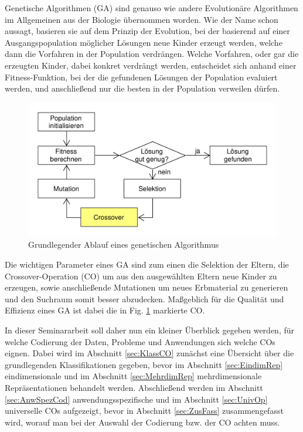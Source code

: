 \documentclass{llncs}
\begin{document}
	Genetische Algorithmen (GA) sind genauso wie andere Evolutionäre Algorithmen im Allgemeinen aus der Biologie übernommen worden. Wie der Name schon aussagt, basieren sie auf dem Prinzip der Evolution, bei der basierend auf einer Ausgangspopulation möglicher Lösungen neue Kinder erzeugt werden, welche dann die Vorfahren in der Population verdrängen. Welche Vorfahren, oder gar die erzeugten Kinder, dabei konkret verdrängt werden, entscheidet sich anhand einer Fitness-Funktion, bei der die gefundenen Lösungen der Population evaluiert werden, und anschließend nur die besten in der Population verweilen dürfen.
	
	\begin{figure}
		\centering
		\includegraphics[width=.8\columnwidth]{./Figures/GA-Prinzip.pdf}
		\caption{Grundlegender Ablauf eines genetischen Algorithmus}
		\label{fig:abb1}
	\end{figure}	
	
	Die wichtigen Parameter eines GA sind zum einen die Selektion der Eltern, die Crossover-Operation (CO) um aus den ausgewählten Eltern neue Kinder zu erzeugen, sowie anschließende Mutationen um neues Erbmaterial zu generieren und den Suchraum somit besser abzudecken. Maßgeblich für die Qualität und Effizienz eines GA ist dabei die in Fig. \ref{fig:abb1} markierte CO.
	
	In dieser Seminararbeit soll daher nun ein kleiner Überblick gegeben werden, für welche Codierung der Daten, Probleme und Anwendungen sich welche COs eignen. Dabei wird im Abschnitt \ref{sec:KlassCO} zunächst eine Übersicht über die grundlegenden Klassifikationen gegeben, bevor im Abschnitt \ref{sec:EindimRep} eindimensionale und im Abschnitt \ref{sec:MehrdimRep} mehrdimensionale Repräsentationen behandelt werden. Abschließend werden im Abschnitt \ref{sec:AnwSpezCod} anwendungsspezifische und im Abschnitt \ref{sec:UnivOp} universelle COs aufgezeigt, bevor in Abschnitt \ref{sec:ZusFass} zusammengefasst wird, worauf man bei der Auswahl der Codierung bzw. der CO achten muss.
	
\end{document}
